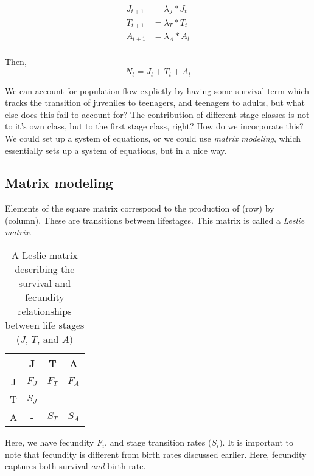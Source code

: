 \documentclass[12pt]{article}
\begin{document}
  \begin{align*}
J_{t+1} &= \lambda_{J} * J_t \\ 
T_{t+1} &= \lambda_{T} * T_t \\
A_{t+1} &= \lambda_{A} * A_t \\
  \end{align*}


Then, \[ N_{t} = J_{t} + T_{t} + A_{t} \]



We can account for population flow explictly by having some survival term which tracks the transition of juveniles to teenagers, and teenagers to adults, but what else does this fail to account for? The contribution of different stage classes is not to it's own class, but to the first stage class, right? How do we incorporate this? We could set up a system of equations, or we could use \textit{matrix modeling}, which essentially sets up a system of equations, but in a nice way.






\clearpage





\subsection*{Matrix modeling}

Elements of the square matrix correspond to the production of (row) by (column). These are transitions between lifestages. This matrix is called a \textit{Leslie matrix}.


\begin{table}
\centering
\caption{A Leslie matrix describing the survival and fecundity relationships between life stages ($J$, $T$, and $A$)}
\label{tab:transition}
\vspace{0.5cm}
\begin{tabular}{cccc}
  & J & T & A \\
  \hline
J & $F_{J}$  &  $F_{T}$  & $F_{A}$ \\
T & $S_{J}$  & -         & -      \\
A & -        & $S_{T}$   & $S_{A}$  \\
\hline
\end{tabular}
\end{table}

Here, we have fecundity $F_{i}$, and stage transition rates ($S_{i}$). It is important to note that fecundity is different from birth rates discussed earlier. Here, fecundity captures both survival \textit{and} birth rate. \\
\end{document}
